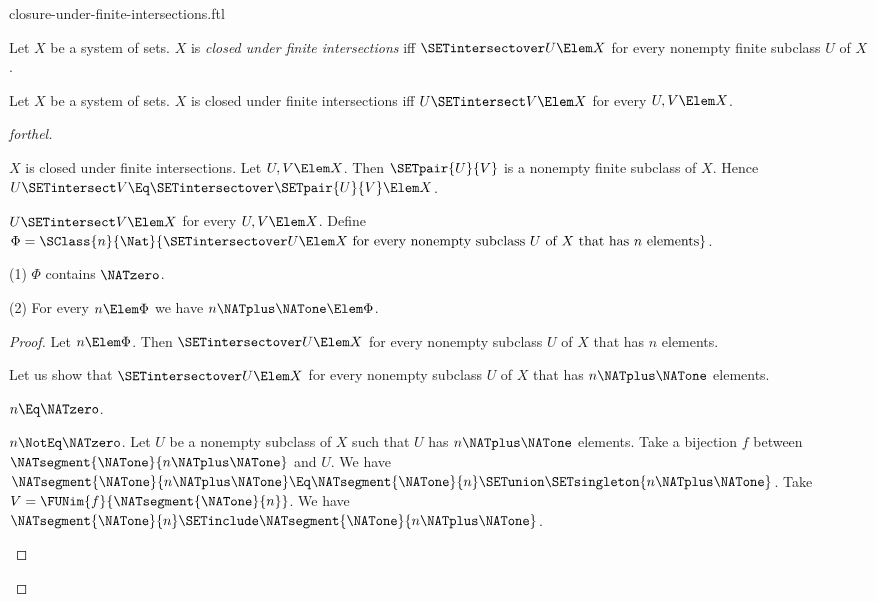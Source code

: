 \documentclass{stex}
\begin{document}
\begin{smodule}{closure-under-finite-intersections.ftl}

\begin{definition}[forthel,id=FOUNDATIONS_14_4297814324543488]
  Let $X$ be a system of sets.
  $X$ is \emph{closed under finite intersections} iff $\SETintersectover U \Elem X$ for every nonempty finite subclass $U$ of $X$.
\end{definition}

\begin{proposition}[forthel,id=FOUNDATIONS_17_1405012582334464]
  Let $X$ be a system of sets.
  $X$ is closed under finite intersections iff $U \SETintersect V \Elem X$ for every $U, V \Elem X$.
\end{proposition}
\begin{proof}[forthel]
  \begin{case}{$X$ is closed under finite intersections.}
    Let $U, V \Elem X$.
    Then $\SETpair{U}{V}$ is a nonempty finite subclass of $X$.
    Hence $U \SETintersect V \Eq \SETintersectover \SETpair{U}{V} \Elem X$.
  \end{case}

  \begin{case}{$U \SETintersect V \Elem X$ for every $U, V \Elem X$.}
    Define $\Phi = \SClass{n}{\Nat}{\SETintersectover U \Elem X\text{ for every nonempty subclass }U\text{ of }X\text{ that has }n\text{ elements}}$.

    (1) $\Phi$ contains $\NATzero$.

    (2) For every $n \Elem \Phi$ we have $n \NATplus \NATone \Elem \Phi$.
    \begin{proof}
      Let $n \Elem \Phi$.
      Then $\SETintersectover U \Elem X$ for every nonempty subclass $U$ of $X$ that has $n$ elements.

      Let us show that $\SETintersectover U \Elem X$ for every nonempty subclass $U$ of $X$ that has $n \NATplus \NATone$ elements.

        \begin{case}{$n \Eq \NATzero$.} \end{case}

        \begin{case}{$n \NotEq \NATzero$.}
          Let $U$ be a nonempty subclass of $X$ such that $U$ has $n \NATplus \NATone$ elements.
          Take a bijection $f$ between $\NATsegment{\NATone}{n \NATplus \NATone}$ and $U$.
          We have $\NATsegment{\NATone}{n \NATplus \NATone} \Eq \NATsegment{\NATone}{n} \SETunion \SETsingleton{n \NATplus \NATone}$.
          Take $V = \FUNim{f}{\NATsegment{\NATone}{n}}$.
          We have $\NATsegment{\NATone}{n} \SETinclude \NATsegment{\NATone}{n \NATplus \NATone}$.


\end{case}
\end{proof}
\end{case}
\end{proof}
\end{smodule}
\end{document}
